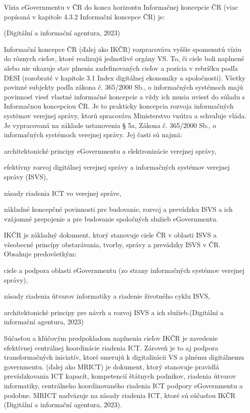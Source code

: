Vízia eGovernmentu v ČR do konca horizontu Informačnej koncepcie ČR (viac popísaná v kapitole 4.3.2 Informační koncepce ČR) je: 

 \scr(Digitální a informační agentura, 2023)

Informační koncepce ČR (ďalej ako IKČR) rozpracováva vyššie spomenutú víziu do rôznych cieľov, ktoré realizujú jednotlivé orgány VS. To, či ciele boli naplnené alebo nie ukazuje stav plnenia zadefinovaných cieľov a pozícia v rebríčku podľa DESI (rozobraté v kapitole 3.1 Index digitálnej ekonomiky a spoločnosti). Všetky povinné subjekty podľa zákona  č. 365/2000 Sb., o informačných systémoch majú povinnosť viesť vlastné informačné koncepcie a vždy ich musia uviesť do súladu s Informačnou koncepciou ČR. Je to prakticky koncepcia rozvoja informačných systémov verejnej správy, ktorú spracováva Ministerstvo vnútra a schvaľuje vláda. Je vypracovaná na základe ustanovenia § 5a, Zákona č. 365/2000 Sb., o informačných systémoch verejnej správy. Jej časti sú najmä:

\startitemize
\item{architektonické principy eGovernmentu a elektronizácie verejnej správy,}
\item{efektívny rozvoj digitálnej verejnej správy a informačných systémov verejnej správy (ISVS),}
\item{zásady riadenia ICT vo verejnej správe,}
\item{základné koncepčné povinnosti pre budovanie, rozvoj a prevádzku ISVS a ich vzájomné prepojenie a pre budovanie spoločných služieb eGovernmentu.}
\stopitemize

IKČR je základný dokument, ktorý stanovuje ciele ČR v oblasti ISVS a všeobecné princípy obstarávania, tvorby, správy a prevádzky ISVS v ČR. Obsahuje predovšetkým:
\startitemize
\item{ciele a podpora oblasti eGovernmentu (zo strany informačných systémov verejnej správy),}
\item{zásady riadenia útvarov informatiky a riadenie životného cyklu ISVS,}
\item{architektonické principy pre návrh a rozvoj ISVS a ich služieb.\scr(Digitální a informační agentura, 2023)}
\stopitemize

Súčasťou a kľúčovým predpokladom naplnenia cieľov IKČR je zavedenie efektívnej centrálnej koordinácie riadenia ICT. Zároveň je to aj podpora transformačných iniciatív, ktoré smerujú k digitalizácii VS a plnému digitálnemu governmentu.  (ďalej ako MRICT) je dokument, ktorý stanovuje pravidlá prevádzkovania ICT kapacít, kompetencií štátnych podnikov, riadenia útvarov informatiky, centrálneho koordinovaného riadenia ICT podpory eGovernmentu a podobne. MRICT nadväzuje na zásady riadenia ICT, ktoré sú súčasťou IKČR \scr(Digitální a informační agentura, 2023).

